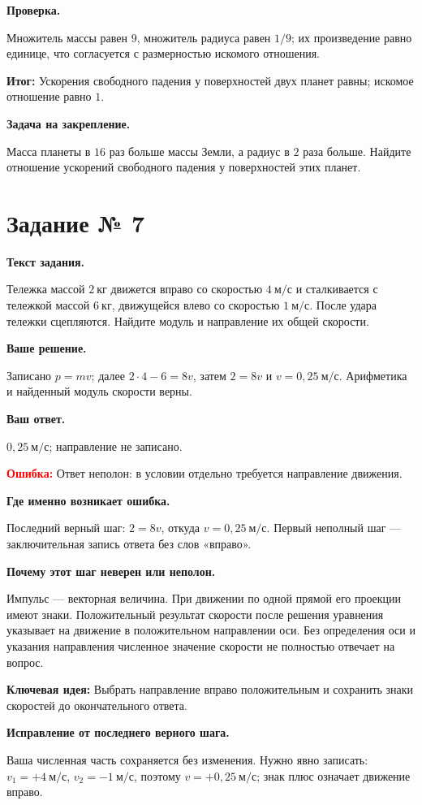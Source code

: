 \documentclass[11pt,a4paper]{article}
\newcommand{\reviewblock}[2]{\par\medskip\noindent\textbf{#1}\par\noindent#2\par}
\newcommand{\errorblock}[1]{\par\medskip\noindent\textcolor{red}{\textbf{Ошибка:}} #1\par}
\newcommand{\ideablock}[1]{\par\medskip\noindent\textcolor{blue!60!black}{\textbf{Ключевая идея:}} #1\par}
\newcommand{\resultblock}[1]{\par\medskip\noindent\textcolor{teal!60!black}{\textbf{Итог:}} #1\par}
\begin{document}
\reviewblock{Проверка.}{Множитель массы равен $9$, множитель радиуса равен $1/9$; их произведение равно единице, что согласуется с размерностью искомого отношения.}

\resultblock{Ускорения свободного падения у поверхностей двух планет равны; искомое отношение равно $1$.}

\reviewblock{Задача на закрепление.}{Масса планеты в $16$ раз больше массы Земли, а радиус в $2$ раза больше. Найдите отношение ускорений свободного падения у поверхностей этих планет.}
\newpage
{}\label{task:7}

\section*{Задание № 7}

\reviewblock{Текст задания.}{Тележка массой $2\ \text{кг}$ движется вправо со скоростью $4\ \text{м/с}$ и сталкивается с тележкой массой $6\ \text{кг}$, движущейся влево со скоростью $1\ \text{м/с}$. После удара тележки сцепляются. Найдите модуль и направление их общей скорости.}

\reviewblock{Ваше решение.}{Записано $p=mv$; далее $2\cdot4-6=8v$, затем $2=8v$ и $v=0{,}25\ \text{м/с}$. Арифметика и найденный модуль скорости верны.}

\reviewblock{Ваш ответ.}{$0{,}25\ \text{м/с}$; направление не записано.}

\errorblock{Ответ неполон: в условии отдельно требуется направление движения.}

\reviewblock{Где именно возникает ошибка.}{Последний верный шаг: $2=8v$, откуда $v=0{,}25\ \text{м/с}$. Первый неполный шаг --- заключительная запись ответа без слов «вправо».}

\reviewblock{Почему этот шаг неверен или неполон.}{Импульс --- векторная величина. При движении по одной прямой его проекции имеют знаки. Положительный результат скорости после решения уравнения указывает на движение в положительном направлении оси. Без определения оси и указания направления численное значение скорости не полностью отвечает на вопрос.}

\ideablock{Выбрать направление вправо положительным и сохранить знаки скоростей до окончательного ответа.}

\reviewblock{Исправление от последнего верного шага.}{Ваша численная часть сохраняется без изменения. Нужно явно записать: $v_1=+4\ \text{м/с}$, $v_2=-1\ \text{м/с}$, поэтому $v=+0{,}25\ \text{м/с}$; знак плюс означает движение вправо.}
\end{document}

